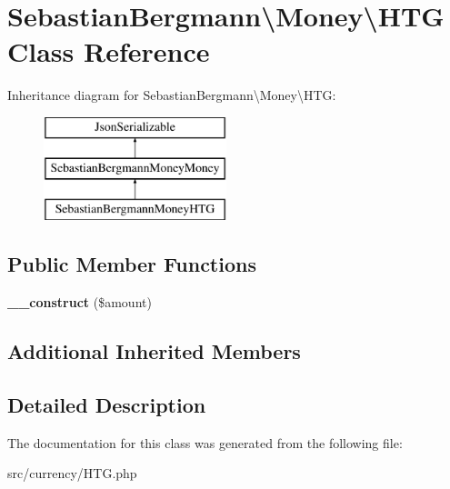 \hypertarget{classSebastianBergmann_1_1Money_1_1HTG}{}\section{Sebastian\+Bergmann\textbackslash{}Money\textbackslash{}H\+T\+G Class Reference}
\label{classSebastianBergmann_1_1Money_1_1HTG}
Inheritance diagram for Sebastian\+Bergmann\textbackslash{}Money\textbackslash{}H\+T\+G\+:\begin{figure}[H]
\begin{center}
\leavevmode
\includegraphics[height=3.000000cm]{classSebastianBergmann_1_1Money_1_1HTG}
\end{center}
\end{figure}
\subsection*{Public Member Functions}
\begin{DoxyCompactItemize}
\item 
\hypertarget{classSebastianBergmann_1_1Money_1_1HTG_a34ff969672fa49e466fab41ae29d38ba}{}{\bfseries \+\_\+\+\_\+construct} (\$amount)\label{classSebastianBergmann_1_1Money_1_1HTG_a34ff969672fa49e466fab41ae29d38ba}

\end{DoxyCompactItemize}
\subsection*{Additional Inherited Members}


\subsection{Detailed Description}


The documentation for this class was generated from the following file\+:\begin{DoxyCompactItemize}
\item 
src/currency/H\+T\+G.\+php\end{DoxyCompactItemize}
